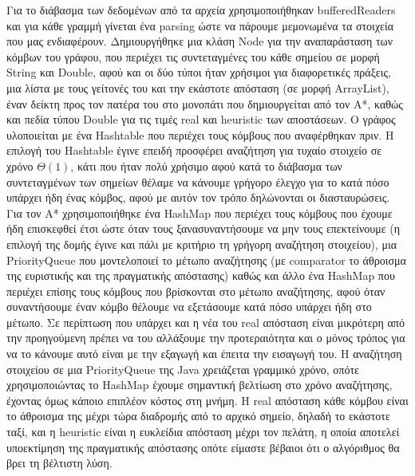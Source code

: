 \documentclass[12pt, a4 paper]{article}
\begin{document}
\setcounter{page}{1}
Για το διάβασμα των δεδομένων από τα αρχεία χρησιμοποιήθηκαν \textlatin{bufferedReaders} και για κάθε γραμμή γίνεται ένα \textlatin{parsing} ώστε να πάρουμε μεμονωμένα τα στοιχεία που μας ενδιαφέρουν. Δημιουργήθηκε μια κλάση \textlatin{Node} για την αναπαράσταση των κόμβων του γράφου, που περιέχει τις συντεταγμένες του κάθε σημείου σε μορφή \textlatin{String} και \textlatin{Double}, αφού και οι δύο τύποι ήταν χρήσιμοι για διαφορετικές πράξεις, μια λίστα με τους γείτονές του και την εκάστοτε απόσταση (σε μορφή \textlatin{ArrayList}), έναν δείκτη προς τον πατέρα του στο μονοπάτι που δημιουργείται από τον Α*, καθώς και πεδία τύπου \textlatin{Double} για τις τιμές \textlatin{real} και \textlatin{heuristic} των αποστάσεων. Ο γράφος υλοποιείται με ένα \textlatin{Hashtable} που περιέχει τους κόμβους που αναφέρθηκαν πριν. Η επιλογή του \textlatin{Hashtable} έγινε επειδή προσφέρει αναζήτηση για τυχαίο στοιχείο σε χρόνο $\Theta(1)$, κάτι που ήταν πολύ χρήσιμο αφού κατά το διάβασμα των συντεταγμένων των σημείων θέλαμε να κάνουμε γρήγορο έλεγχο για το κατά πόσο υπάρχει ήδη ένας κόμβος, αφού με αυτόν τον τρόπο δηλώνονται οι διασταυρώσεις. Για τον Α* χρησιμοποιήθηκε ένα \textlatin{HashMap} που περιέχει τους κόμβους που έχουμε ήδη επισκεφθεί έτσι ώστε όταν τους ξανασυναντήσουμε να μην τους επεκτείνουμε (η επιλογή της δομής έγινε και πάλι με κριτήριο τη γρήγορη αναζήτηση στοιχείου), μια \textlatin{PriorityQueue} που μοντελοποιεί το μέτωπο αναζήτησης (με \textlatin{comparator} το άθροισμα της ευριστικής και της πραγματικής απόστασης) καθώς και άλλο ένα \textlatin{HashMap} που περιέχει επίσης τους κόμβους που βρίσκονται στο μέτωπο αναζήτησης, αφού όταν συναντήσουμε έναν κόμβο θέλουμε να εξετάσουμε κατά πόσο υπάρχει ήδη στο μέτωπο. Σε περίπτωση που υπάρχει και η νέα του \textlatin{real} απόσταση είναι μικρότερη από την προηγούμενη πρέπει να του αλλάξουμε την προτεραιότητα και ο μόνος τρόπος για να το κάνουμε αυτό είναι με την εξαγωγή και έπειτα την εισαγωγή του. Η αναζήτηση στοιχείου σε μια \textlatin{PriorityQueue} της \textlatin{Java} χρειάζεται γραμμικό χρόνο, οπότε χρησιμοποιώντας το \textlatin{HashMap} έχουμε σημαντική βελτίωση στο χρόνο αναζήτησης, έχοντας όμως κάποιο επιπλέον κόστος στη μνήμη. Η \textlatin{real}  απόσταση κάθε κόμβου είναι το άθροισμα της μέχρι τώρα διαδρομής από το αρχικό σημείο, δηλαδή το εκάστοτε ταξί, και η \textlatin{heuristic} είναι η ευκλείδια απόσταση μέχρι τον πελάτη, η οποία αποτελεί υποεκτίμηση της πραγματικής απόστασης οπότε είμαστε βέβαιοι ότι ο αλγόριθμος θα βρει τη βέλτιστη λύση.\\
\end{document}
